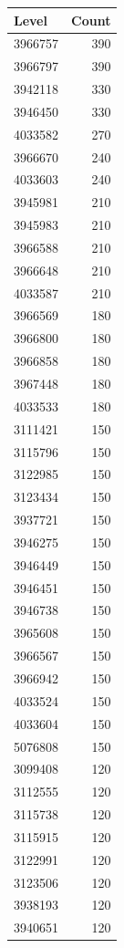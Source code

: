 \begin{table}[ht]
\centering
\begin{tabular}{lr}
  \hline
Level & Count \\ 
  \hline
3966757 & 390 \\ 
  3966797 & 390 \\ 
  3942118 & 330 \\ 
  3946450 & 330 \\ 
  4033582 & 270 \\ 
  3966670 & 240 \\ 
  4033603 & 240 \\ 
  3945981 & 210 \\ 
  3945983 & 210 \\ 
  3966588 & 210 \\ 
  3966648 & 210 \\ 
  4033587 & 210 \\ 
  3966569 & 180 \\ 
  3966800 & 180 \\ 
  3966858 & 180 \\ 
  3967448 & 180 \\ 
  4033533 & 180 \\ 
  3111421 & 150 \\ 
  3115796 & 150 \\ 
  3122985 & 150 \\ 
  3123434 & 150 \\ 
  3937721 & 150 \\ 
  3946275 & 150 \\ 
  3946449 & 150 \\ 
  3946451 & 150 \\ 
  3946738 & 150 \\ 
  3965608 & 150 \\ 
  3966567 & 150 \\ 
  3966942 & 150 \\ 
  4033524 & 150 \\ 
  4033604 & 150 \\ 
  5076808 & 150 \\ 
  3099408 & 120 \\ 
  3112555 & 120 \\ 
  3115738 & 120 \\ 
  3115915 & 120 \\ 
  3122991 & 120 \\ 
  3123506 & 120 \\ 
  3938193 & 120 \\ 
  3940651 & 120 \\ 

\end{tabular}
\end{table}
